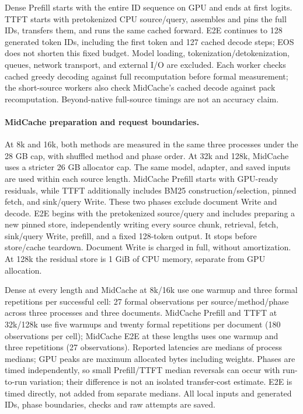 Dense Prefill starts with the entire ID sequence on GPU and ends at first logits. TTFT starts with pretokenized CPU source/query, assembles and pins the full IDs, transfers them, and runs the same cached forward. E2E continues to 128 generated token IDs, including the first token and 127 cached decode steps; EOS does not shorten this fixed budget. Model loading, tokenization/detokenization, queues, network transport, and external I/O are excluded. Each worker checks cached greedy decoding against full recomputation before formal measurement; the short-source workers also check MidCache's cached decode against pack recomputation. Beyond-native full-source timings are not an accuracy claim.

\paragraph{MidCache preparation and request boundaries.}
At 8k and 16k, both methods are measured in the same three processes under the 28 GB cap, with shuffled method and phase order. At 32k and 128k, MidCache uses a stricter 26 GB allocator cap. The same model, adapter, and saved inputs are used within each source length. MidCache Prefill starts with GPU-ready residuals, while TTFT additionally includes BM25 construction/selection, pinned fetch, and sink/query Write. These two phases exclude document Write and decode. E2E begins with the pretokenized source/query and includes preparing a new pinned store, independently writing every source chunk, retrieval, fetch, sink/query Write, prefill, and a fixed 128-token output. It stops before store/cache teardown. Document Write is charged in full, without amortization. At 128k the residual store is 1 GiB of CPU memory, separate from GPU allocation.

Dense at every length and MidCache at 8k/16k use one warmup and three formal repetitions per successful cell: 27 formal observations per source/method/phase across three processes and three documents. MidCache Prefill and TTFT at 32k/128k use five warmups and twenty formal repetitions per document (180 observations per cell); MidCache E2E at these lengths uses one warmup and three repetitions (27 observations). Reported latencies are medians of process medians; GPU peaks are maximum allocated bytes including weights. Phases are timed independently, so small Prefill/TTFT median reversals can occur with run-to-run variation; their difference is not an isolated transfer-cost estimate. E2E is timed directly, not added from separate medians. All local inputs and generated IDs, phase boundaries, checks and raw attempts are saved.

